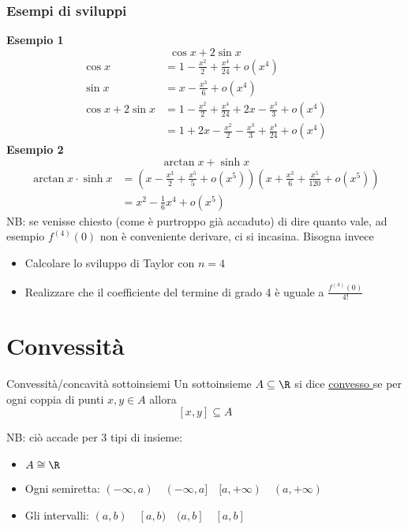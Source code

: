 \subsubsection{Esempi di sviluppi}
\textbf{Esempio 1}
\[
	\cos x + 2 \sin x
\]
\begin{align*}
	\cos x            & =  1-\frac{x^2}{2}+\frac{x^{4}}{24} + o\left( x^{4} \right)                           \\
	\sin x            & =  x - \frac{x^3}{6} + o \left( x^{4} \right)                                         \\
	\cos x + 2 \sin x & =  1 - \frac{x^2}{2} + \frac{x^{4}}{24} + 2x - \frac{x^3}{3} + o \left( x^{4} \right) \\
	                  & = 1 + 2x - \frac{x^2}{2} - \frac{x^3}{3} + \frac{x^{4}}{ 24} + o\left( x^{4} \right)
\end{align*}
\textbf{Esempio 2}
\[
	\arctan x + \sinh x
\]
\begin{align*}
	\arctan x \cdot \sinh x & = \left( x- \frac{x^3}{2} + \frac{x^{5}}{5} + o\left( x^{5} \right)  \right) \left( x + \frac{x^3}{6} + \frac{x^{5}}{120} + o \left( x^{5} \right)  \right) \\
	                        & = x^2 - \frac{1}{6}x^{4} + o\left( x^{5} \right)
\end{align*}
NB: se venisse chiesto (come è purtroppo già accaduto) di dire quanto vale, ad esempio $f^{\left( 4 \right) }\left( 0 \right) $ non è conveniente derivare, ci si incasina. Bisogna invece
\begin{itemize}
	\item Calcolare lo sviluppo di Taylor con $n=4$
	\item Realizzare che il coefficiente del termine di grado 4 è uguale a $\frac{f^{\left( 4 \right) }\left( 0 \right)}{4!} $
\end{itemize}

\section{Convessità}
\begin{definizione}{Convessità/concavità sottoinsiemi}
	Un sottoinsieme $ A \subseteq \R$ si dice \underline{convesso }se per ogni coppia di punti $x,y \in  A$ allora
	\[
		\left[ x,y \right] \subseteq A
	\]

\end{definizione}
NB: ciò accade per 3 tipi di insieme:
\begin{itemize}
	\item $A \cong \R$
	\item Ogni semiretta: $\left( -\infty, a \right) \quad (-\infty, a ]  \quad [a, + \infty) \quad \left( a,+ \infty \right) $
	\item Gli intervalli: $\left( a,b \right) \quad [a,b) \quad (a, b] \quad \left[ a,b \right] $
\end{itemize}

